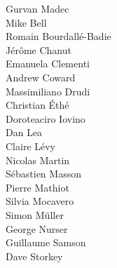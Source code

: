
 Gurvan Madec                \\
                            Mike Bell                   \\
 Romain Bourdall\'{e}-Badie  \\
                            J\'{e}r\^{o}me Chanut       \\
 Emanuela Clementi           \\
 Andrew Coward               \\
 Massimiliano Drudi          \\
                            Christian \'{E}th\'{e}      \\
 Doroteaciro Iovino          \\
                            Dan Lea                     \\
 Claire L\'{e}vy             \\
                            Nicolas Martin              \\
 S\'{e}bastien Masson        \\
                            Pierre Mathiot              \\
 Silvia Mocavero             \\
                            Simon M\"{u}ller            \\
                            George Nurser               \\
 Guillaume Samson            \\
                            Dave Storkey                \\
